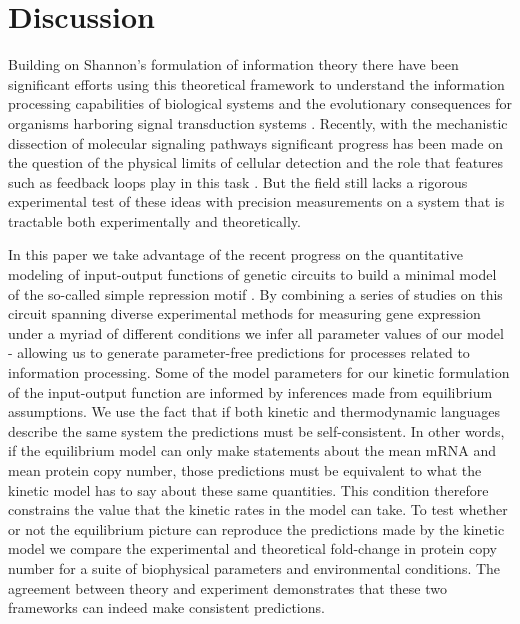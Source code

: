 \section*{Discussion}

Building on Shannon's formulation of information theory there have been
significant efforts using this theoretical framework to understand the
information processing capabilities of biological systems and the evolutionary
consequences for organisms harboring signal transduction systems
\cite{Bergstrom2004, Taylor2007a, Tkacik2008, Polani2009, Nemenman2010,
Rivoire2011}. Recently, with the mechanistic dissection of molecular signaling
pathways significant progress has been made on the question of the physical
limits of cellular detection and the role that features such as feedback loops
play in this task \cite{Bialek2005, Libby2007, Tkacik2011, Rhee2012a,
Voliotis2014a}. But the field still lacks a rigorous experimental test of these
ideas with precision measurements on a system that is tractable both
experimentally and theoretically.

In this paper we take advantage of the recent progress on the quantitative
modeling of input-output functions of genetic circuits to build a minimal model
of the so-called simple repression motif . By combining a
series of studies on this circuit spanning diverse experimental methods for
measuring gene expression under a myriad of different conditions we infer all
parameter values of our model - allowing us to generate parameter-free
predictions for processes related to information processing. Some of the model
parameters for our kinetic formulation of the input-output function are informed
by inferences made from equilibrium assumptions. We use the fact that if both
kinetic and thermodynamic languages describe the same system the predictions
must be self-consistent. In other words, if the equilibrium model can only make
statements about the mean mRNA and mean protein copy number, those predictions
must be equivalent to what the kinetic model has to say about these same
quantities. This condition therefore constrains the value that the kinetic rates
in the model can take. To test whether or not the equilibrium picture can
reproduce the predictions made by the kinetic model we compare the experimental
and theoretical fold-change in protein copy number for a suite of biophysical
parameters and environmental conditions. The agreement between theory and
experiment demonstrates that these two frameworks can indeed make consistent
predictions.

